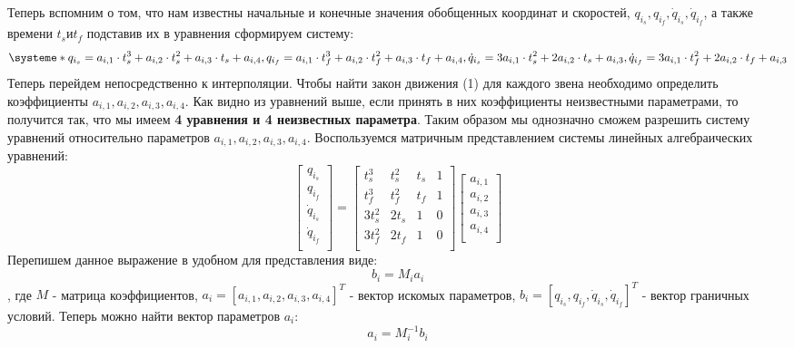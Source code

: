 Теперь вспомним о том, что нам известны начальные и конечные значения обобщенных координат и скоростей, $q_{i_{s}}, q_{i_{f}},\dot{q}_{i_{s}}, \dot{q}_{i_{f}}$, а также времени $t_s и t_f$ подставив их в уравнения сформируем систему:
\begin{equation}\label{eq:model}
\systeme*{
q_{i_{s}}=a_{i,1}\cdot t_s^3  + a_{i,2}\cdot t_s^2 + a_{i,3}\cdot t_s + a_{i,4},
q_{i_{f}}=a_{i,1}\cdot t_f^3  + a_{i,2}\cdot t_f^2 + a_{i,3}\cdot t_f + a_{i,4},
\dot{q}_{i_{s}}=3a_{i,1}\cdot t_s^2  + 2a_{i,2}\cdot t_s + a_{i,3},
\dot{q}_{i_{f}}=3a_{i,1}\cdot t_f^2  + 2a_{i,2}\cdot t_f + a_{i,3}
}
\end{equation}
Теперь перейдем непосредственно к интерполяции. Чтобы найти закон движения (1) для каждого звена необходимо определить коэффициенты $a_{i,1}, a_{i,2}, a_{i,3}, a_{i,4}$. Как видно из уравнений выше, если принять в них коэффициенты неизвестными параметрами, то получится так, что мы имеем \textbf{4 уравнения и 4 неизвестных параметра}.
Таким образом мы однозначно сможем разрешить систему уравнений относительно параметров $a_{i,1}, a_{i,2}, a_{i,3}, a_{i,4}$.
Воспользуемся матричным представлением системы линейных алгебраических уравнений:
\begin{equation}\label{eq:model}
     \begin{bmatrix}
    q_{i_{s}} \\
    q_{i_{f}} \\
    \dot{q}_{i_{s}} \\
    \dot{q}_{i_{f}} \\
    \end{bmatrix}
    =
    \begin{bmatrix}
    t^3_s & t^2_s & t_s & 1\\
    t^3_f & t^2_f & t_f & 1\\
    3t^2_s & 2t_s & 1 & 0\\
    3t^2_f & 2t_f & 1 & 0\\
    \end{bmatrix}
    \begin{bmatrix}
    a_{i,1}\\
    a_{i,2}\\
    a_{i,3}\\
    a_{i,4}\\
    \end{bmatrix}
\end{equation}
Перепишем данное выражение в удобном для представления виде:
\begin{equation}\label{eq:model}
b_i = M_i a_i
\end{equation}
, где $M$ - матрица коэффициентов, $a_i=[a_{i,1}, a_{i,2}, a_{i,3}, a_{i,4}]^T$ - вектор искомых параметров,  $b_i=[q_{i_{s}}, q_{i_{f}}, \dot{q}_{i_{s}}, \dot{q}_{i_{f}}]^T$ - вектор граничных условий.
Теперь можно найти вектор параметров $a_i$:
\begin{equation}\label{eq:model}
a_i = M_i^{-1} b_i 
\end{equation}

